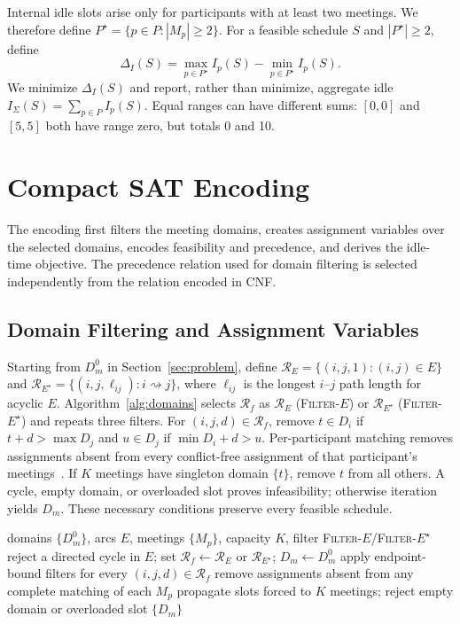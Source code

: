 \documentclass[conference,a4paper]{IEEEtran}
\newcommand{\revised}[1]{#1}
\begin{document}
Internal idle slots arise only for participants with at least two meetings. We therefore define $P^\star=\{p\in P:|M_p|\ge2\}$.  For a feasible schedule $S$ and $|P^\star|\ge2$, define
\begin{equation}
\Delta_I(S)=\max_{p\in P^\star}I_p(S)-\min_{p\in P^\star}I_p(S).
\label{eq:idle-range}
\end{equation}
\revised{We minimize $\Delta_I(S)$ and report, rather than minimize, aggregate idle $I_\Sigma(S)=\sum_{p\in P}I_p(S)$. Equal ranges can have different sums: $[0,0]$ and $[5,5]$ both have range zero, but totals 0 and 10.}

\section{Compact SAT Encoding}
\label{sec:encoding}

The encoding first filters the meeting domains, creates assignment variables over the selected domains, encodes feasibility and precedence, and derives the idle-time objective.  The precedence relation used for domain filtering is selected independently from the relation encoded in CNF.

\subsection{Domain Filtering and Assignment Variables}

\revised{Starting from $D_m^0$ in Section~\ref{sec:problem}, define $\mathcal R_E=\{(i,j,1):(i,j)\in E\}$ and $\mathcal R_{E^\star}=\{(i,j,\ell_{ij}):i\rightsquigarrow j\}$, where $\ell_{ij}$ is the longest $i$--$j$ path length for acyclic $E$. Algorithm~\ref{alg:domains} selects $\mathcal R_f$ as $\mathcal R_E$ (\mbox{\textsc{Filter-}$E$}) or $\mathcal R_{E^\star}$ (\mbox{\textsc{Filter-}$E^\star$}) and repeats three filters. For $(i,j,d)\in\mathcal R_f$, remove $t\in D_i$ if $t+d>\max D_j$ and $u\in D_j$ if $\min D_i+d>u$. Per-participant matching removes assignments absent from every conflict-free assignment of that participant's meetings~\cite{regin1994}. If $K$ meetings have singleton domain $\{t\}$, remove $t$ from all others. A cycle, empty domain, or overloaded slot proves infeasibility; otherwise iteration yields $D_m$. These necessary conditions preserve every feasible schedule.}

\begin{algorithm}[t]
\caption{Solution-Preserving Domain Filtering}
\label{alg:domains}
\small
\begin{algorithmic}[1]
\REQUIRE domains $\{D_m^0\}$, arcs $E$, meetings $\{M_p\}$, capacity $K$, filter \mbox{\textnormal{\textsc{Filter-}}\ensuremath{E}}/\mbox{\textnormal{\textsc{Filter-}}\ensuremath{E^\star}}
\STATE reject a directed cycle in $E$; set $\mathcal R_f\leftarrow\mathcal R_E$ or $\mathcal R_{E^\star}$; $D_m\leftarrow D_m^0$
\REPEAT
  \STATE apply endpoint-bound filters for every $(i,j,d)\in\mathcal R_f$
  \STATE remove assignments absent from any complete matching of each $M_p$
  \STATE propagate slots forced to $K$ meetings; reject empty domain or overloaded slot
\RETURN $\{D_m\}$
\end{algorithmic}
\end{algorithm}
\end{document}
